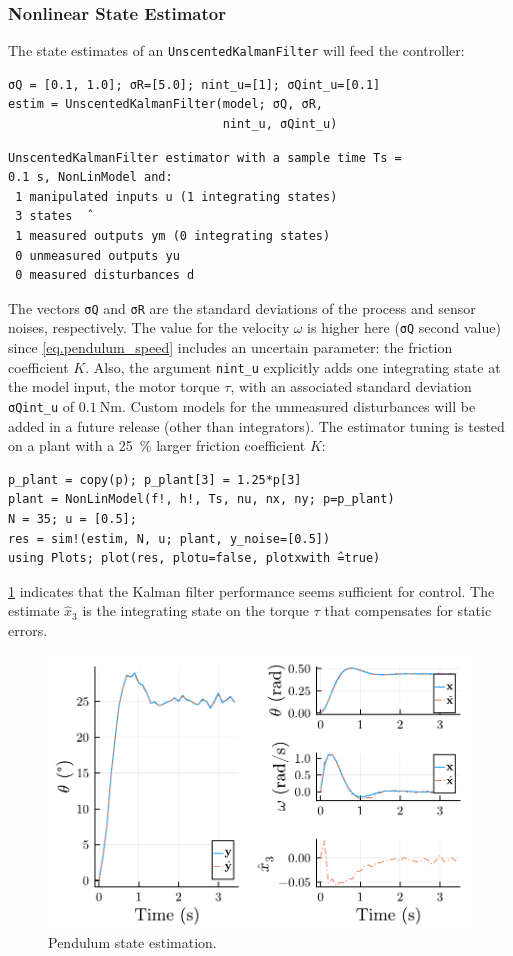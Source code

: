 \subsubsection{Nonlinear State Estimator}

The state estimates of an \texttt{UnscentedKalmanFilter} will feed the controller:
\begin{verbatim}
σQ = [0.1, 1.0]; σR=[5.0]; nint_u=[1]; σQint_u=[0.1]
estim = UnscentedKalmanFilter(model; σQ, σR, 
                              nint_u, σQint_u)
\end{verbatim}
\spacerepl
\begin{verbatim}
UnscentedKalmanFilter estimator with a sample time Ts =
0.1 s, NonLinModel and:
 1 manipulated inputs u (1 integrating states)
 3 states  ̂
 1 measured outputs ym (0 integrating states)
 0 unmeasured outputs yu
 0 measured disturbances d
\end{verbatim}
The vectors \texttt{σQ} and \texttt{σR} are the standard deviations of the process and sensor noises, respectively. The value for the velocity $\omega$ is higher here (\texttt{σQ} second value) since \eqref{eq.pendulum_speed} includes an uncertain parameter: the friction coefficient $K$. Also, the argument \texttt{nint\_u} explicitly adds one integrating state at the model input, the motor torque $\tau$, with an associated standard deviation \texttt{σQint\_u} of $\SI{0.1}{\newton\meter}$. Custom models for the unmeasured disturbances will be added in a future release (other than integrators). The estimator tuning is tested on a plant with a \SI{25}{\percent} larger friction coefficient $K$: 
\begin{verbatim}
p_plant = copy(p); p_plant[3] = 1.25*p[3]
plant = NonLinModel(f!, h!, Ts, nu, nx, ny; p=p_plant)
N = 35; u = [0.5]; 
res = sim!(estim, N, u; plant, y_noise=[0.5])
using Plots; plot(res, plotu=false, plotxwith ̂=true)
\end{verbatim}
\cref{fig:plot_NonLinMPC1} indicates that the Kalman filter performance seems sufficient for control. The estimate $\hat{x}_3$ is the integrating state on the torque $\tau$ that compensates for static errors. 

\begin{figure}[ht]
    \centering
    \includegraphics[width=\columnwidth]{fig/plot_NonLinMPC1.pdf}
    \caption{Pendulum state estimation.}\label{fig:plot_NonLinMPC1}
\end{figure}

